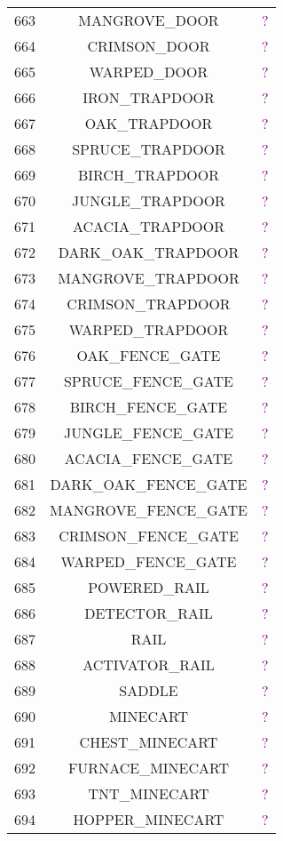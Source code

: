 \documentclass[11pt]{article}
\newcommand\myworries[1]{\textcolor{purple}{#1}}
\begin{document}
\begin{longtable}{ |c|c|c| }
	663 & MANGROVE\_DOOR & \myworries{?} \\
	664 & CRIMSON\_DOOR & \myworries{?} \\
	665 & WARPED\_DOOR & \myworries{?} \\
	666 & IRON\_TRAPDOOR & \myworries{?} \\
	667 & OAK\_TRAPDOOR & \myworries{?} \\
	668 & SPRUCE\_TRAPDOOR & \myworries{?} \\
	669 & BIRCH\_TRAPDOOR & \myworries{?} \\
	670 & JUNGLE\_TRAPDOOR & \myworries{?} \\
	671 & ACACIA\_TRAPDOOR & \myworries{?} \\
	672 & DARK\_OAK\_TRAPDOOR & \myworries{?} \\
	673 & MANGROVE\_TRAPDOOR & \myworries{?} \\
	674 & CRIMSON\_TRAPDOOR & \myworries{?} \\
	675 & WARPED\_TRAPDOOR & \myworries{?} \\
	676 & OAK\_FENCE\_GATE & \myworries{?} \\
	677 & SPRUCE\_FENCE\_GATE & \myworries{?} \\
	678 & BIRCH\_FENCE\_GATE & \myworries{?} \\
	679 & JUNGLE\_FENCE\_GATE & \myworries{?} \\
	680 & ACACIA\_FENCE\_GATE & \myworries{?} \\
	681 & DARK\_OAK\_FENCE\_GATE & \myworries{?} \\
	682 & MANGROVE\_FENCE\_GATE & \myworries{?} \\
	683 & CRIMSON\_FENCE\_GATE & \myworries{?} \\
	684 & WARPED\_FENCE\_GATE & \myworries{?} \\
	685 & POWERED\_RAIL & \myworries{?} \\
	686 & DETECTOR\_RAIL & \myworries{?} \\
	687 & RAIL & \myworries{?} \\
	688 & ACTIVATOR\_RAIL & \myworries{?} \\
	689 & SADDLE & \myworries{?} \\
	690 & MINECART & \myworries{?} \\
	691 & CHEST\_MINECART & \myworries{?} \\
	692 & FURNACE\_MINECART & \myworries{?} \\
	693 & TNT\_MINECART & \myworries{?} \\
	694 & HOPPER\_MINECART & \myworries{?} \\

\end{longtable}
\end{document}
